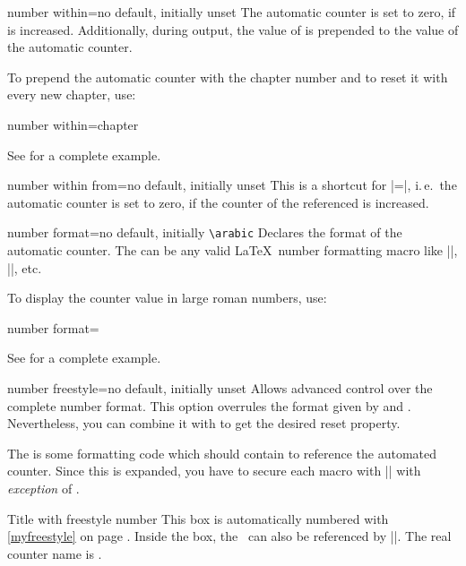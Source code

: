 \clearpage
\begin{newTcbKey}{number within}{=}{no default, initially unset}
The automatic counter is set to zero, if  is increased.
Additionally, during output, the value of  is prepended to the value of
the automatic counter.\par
To prepend the automatic counter with the chapter number and to reset it
with every new chapter, use:
\begin{dispListing}
number within=chapter
\end{dispListing}
See  for a complete example.
\end{newTcbKey}


\begin{newTcbKey}[][doc new=2025-07-21]{number within from}{=}{no default, initially unset}
This is a shortcut for |=|,
i.\,e.\ the automatic counter is set to zero, if the counter of the referenced  is increased.
\end{newTcbKey}


\begin{newTcbKey}{number format}{=}{no default, initially \texttt{\textbackslash arabic}}
Declares the format of the automatic counter. The  can be
any valid \LaTeX\ number formatting macro like |\arabic|, |\roman|, etc.\par
To display the counter value in large roman numbers, use:
\begin{dispListing}
number format=\Roman
\end{dispListing}
See  for a complete example.
\end{newTcbKey}


\begin{newTcbKey}{number freestyle}{=}{no default, initially unset}
Allows advanced control over the complete number format. This option overrules
the format given by  and .
Nevertheless, you can combine it with  to
get the desired reset property.\par
The  is some formatting code which should contain  to
reference the automated counter. Since this  is expanded, you have
to secure each macro with |\noexpand| with \emph{exception} of .


\begin{dispExample}
\begin{phbox}[label={myfreestyle}]{Title with freestyle number}
This box is automatically numbered with \ref{myfreestyle} on page
\pageref{myfreestyle}. Inside the box, the \thetcbcounter\ can
also be referenced by |\thetcbcounter|.
The real counter name is \texttt{\tcbcounter}.
\end{phbox}
\end{dispExample}
\end{newTcbKey}

